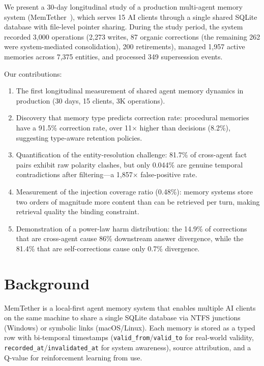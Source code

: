 \documentclass[11pt]{article}
\begin{document}
We present a 30-day longitudinal study of a production multi-agent memory system (MemTether~\cite{memtether}), which serves 15 AI clients through a single shared SQLite database with file-level pointer sharing. During the study period, the system recorded 3,000 operations (2,273 writes, 87 organic corrections (the remaining 262 were system-mediated consolidation), 200 retirements), managed 1,957 active memories across 7,375 entities, and processed 349 supersession events.

Our contributions:
\begin{enumerate}
\item The first longitudinal measurement of shared agent memory dynamics in production (30 days, 15 clients, 3K operations).
\item Discovery that memory type predicts correction rate: procedural memories have a 91.5\% correction rate, over 11$\times$ higher than decisions (8.2\%), suggesting type-aware retention policies.
\item Quantification of the entity-resolution challenge: 81.7\% of cross-agent fact pairs exhibit raw polarity clashes, but only 0.044\% are genuine temporal contradictions after filtering---a 1,857$\times$ false-positive rate.
\item Measurement of the injection coverage ratio (0.48\%): memory systems store two orders of magnitude more content than can be retrieved per turn, making retrieval quality the binding constraint.
\item Demonstration of a power-law harm distribution: the 14.9\% of corrections that are cross-agent cause 86\% downstream answer divergence, while the 81.4\% that are self-corrections cause only 0.7\% divergence.
\end{enumerate}

\section{Background}
\label{sec:background}

MemTether is a local-first agent memory system that enables multiple AI clients on the same machine to share a single SQLite database via NTFS junctions (Windows) or symbolic links (macOS/Linux). Each memory is stored as a typed row with bi-temporal timestamps (\texttt{valid\_from}/\texttt{valid\_to} for real-world validity, \texttt{recorded\_at}/\texttt{invalidated\_at} for system awareness), source attribution, and a Q-value for reinforcement learning from use.
\end{document}
